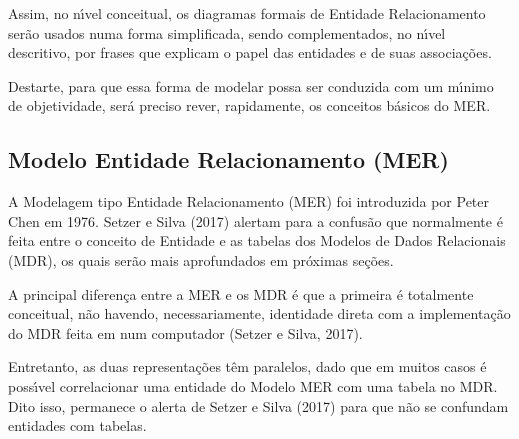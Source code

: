 \documentclass[
12pt,		%
openright,	%
twoside,  %
a4paper,			%
chapter=TITLE,		%
english,			%
french,				%
spanish,			%
brazil				%
]{USPSC-classe/USPSC}
\begin{document}
Assim, no n\'{\i}vel conceitual, os diagramas formais de Entidade Relacionamento ser\~ao usados numa forma simplificada, sendo complementados, no n\'{\i}vel descritivo, por frases que explicam o papel das entidades e de suas associa\c{c}\~oes.














Destarte, para que essa forma de modelar possa ser conduzida com um m\'{\i}nimo de objetividade, ser\'a preciso rever, rapidamente, os conceitos b\'asicos do MER.














\subsection[Modelo Entidade Relacionamento (MER)]{Modelo Entidade Relacionamento (MER)}\label{Modelo Entidade Relacionamento (MER)}
A Modelagem tipo Entidade Relacionamento (MER) foi introduzida por Peter Chen em 1976. Setzer e Silva (2017) alertam para a confus\~ao que normalmente \'e feita entre o conceito de Entidade e as tabelas dos Modelos de Dados Relacionais (MDR), os quais ser\~ao mais aprofundados em pr\'oximas se\c{c}\~oes.














A principal diferen\c{c}a entre a MER e os MDR \'e que a primeira \'e totalmente conceitual, n\~ao havendo, necessariamente, identidade direta com a implementa\c{c}\~ao do MDR feita em num computador  (Setzer e Silva, 2017).














Entretanto, as duas representa\c{c}\~oes t\^em paralelos, dado que em muitos casos \'e poss\'{\i}vel correlacionar uma entidade do Modelo MER com uma tabela no MDR. Dito isso, permanece o alerta de  Setzer e Silva (2017) para que n\~ao se confundam entidades com tabelas.
\end{document}
